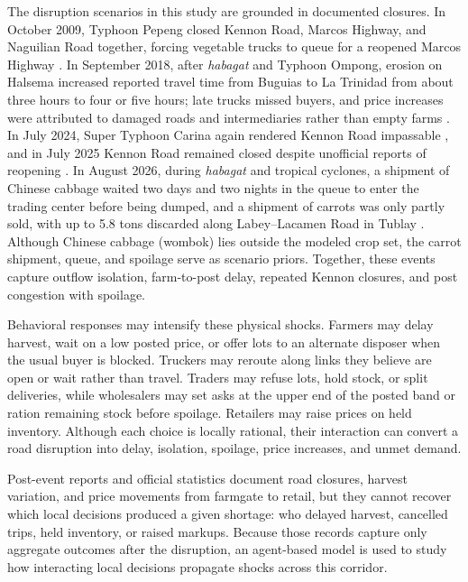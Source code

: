 \documentclass{icsthesis}
\begin{document}
\begin{mainmatter}
			The disruption scenarios in this study are grounded in documented closures. In October 2009, Typhoon Pepeng closed Kennon Road, Marcos Highway, and Naguilian Road together, forcing vegetable trucks to queue for a reopened Marcos Highway \citep{GMANews2009}. In September 2018, after \emph{habagat} and Typhoon Ompong, erosion on Halsema increased reported travel time from Buguias to La Trinidad from about three hours to four or five hours; late trucks missed buyers, and price increases were attributed to damaged roads and intermediaries rather than empty farms \citep{PNA2018,Espiritu2018}. In July 2024, Super Typhoon Carina again rendered Kennon Road impassable \citep{Rappler2024}, and in July 2025 Kennon Road remained closed despite unofficial reports of reopening \citep{PIA2025}. In August 2026, during \emph{habagat} and tropical cyclones, a shipment of Chinese cabbage waited two days and two nights in the queue to enter the trading center before being dumped, and a shipment of carrots was only partly sold, with up to 5.8 tons discarded along Labey--Lacamen Road in Tublay \citep{AntonioDumlao2026}. Although Chinese cabbage (wombok) lies outside the modeled crop set, the carrot shipment, queue, and spoilage serve as scenario priors. Together, these events capture outflow isolation, farm-to-post delay, repeated Kennon closures, and post congestion with spoilage.

			Behavioral responses may intensify these physical shocks. Farmers may delay harvest, wait on a low posted price, or offer lots to an alternate disposer when the usual buyer is blocked. Truckers may reroute along links they believe are open or wait rather than travel. Traders may refuse lots, hold stock, or split deliveries, while wholesalers may set asks at the upper end of the posted band or ration remaining stock before spoilage. Retailers may raise prices on held inventory. Although each choice is locally rational, their interaction can convert a road disruption into delay, isolation, spoilage, price increases, and unmet demand.

			Post-event reports and official statistics document road closures, harvest variation, and price movements from farmgate to retail, but they cannot recover which local decisions produced a given shortage: who delayed harvest, cancelled trips, held inventory, or raised markups. Because those records capture only aggregate outcomes after the disruption, an agent-based model is used to study how interacting local decisions propagate shocks across this corridor.


\end{mainmatter}
\end{document}
